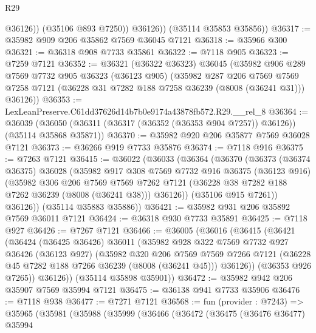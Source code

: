 \begin{lexlean}{R29}
\begin{coremodule}
                @36126))
            (@35106 @893 @7250))
          @36126))
      (@35114 @35853 @35856))
@36317 := @35982 @909 @206 @35862 @7569 @36045 @7121
@36318 := @35966 @300
@36321 := @36318 @908 @7733 @35861
@36322 := @7118 @905
@36323 := @7259 @7121
@36352 := @36321
    (@36322 @36323)
    @36045
    (@35982
      @906
      @289
      @7569
      @7732
      @905
      @36323
      (@36123 @905)
      (@35982
        @287
        @206
        @7569
        @7569
        @7258
        @7121
        (@36228 @31 @7282 @188 @7258 @36239 (@8008 (@36241 @31)))
        @36126))
@36353 := LexLeanPreserve.C61dd37626d14b7b0e9174a43878fb572.R29.__rel_8
@36364 := @36039
    (@36050 (@36311 (@36317 (@36352 (@36353 @904 @7257)) @36126)) (@35114 @35868 @35871))
@36370 := @35982 @920 @206 @35877 @7569 @36028 @7121
@36373 := @36266 @919 @7733 @35876
@36374 := @7118 @916
@36375 := @7263 @7121
@36415 := @36022
    (@36033
      (@36364
        (@36370
          (@36373
            (@36374 @36375)
            @36028
            (@35982
              @917
              @308
              @7569
              @7732
              @916
              @36375
              (@36123 @916)
              (@35982
                @306
                @206
                @7569
                @7569
                @7262
                @7121
                (@36228 @38 @7282 @188 @7262 @36239 (@8008 (@36241 @38)))
                @36126))
            (@35106 @915 @7261))
          @36126))
      (@35114 @35883 @35886))
@36421 := @35982 @931 @206 @35892 @7569 @36011 @7121
@36424 := @36318 @930 @7733 @35891
@36425 := @7118 @927
@36426 := @7267 @7121
@36466 := @36005
    (@36016
      (@36415
        (@36421
          (@36424
            (@36425 @36426)
            @36011
            (@35982
              @928
              @322
              @7569
              @7732
              @927
              @36426
              (@36123 @927)
              (@35982
                @320
                @206
                @7569
                @7569
                @7266
                @7121
                (@36228 @45 @7282 @188 @7266 @36239 (@8008 (@36241 @45)))
                @36126))
            (@36353 @926 @7265))
          @36126))
      (@35114 @35898 @35901))
@36472 := @35982 @942 @206 @35907 @7569 @35994 @7121
@36475 := @36138 @941 @7733 @35906
@36476 := @7118 @938
@36477 := @7271 @7121
@36568 := fun (provider : @7243) =>
  @35965
    (@35981
      (@35988
        (@35999
          (@36466
            (@36472
              (@36475
                (@36476 @36477)
                @35994

\end{coremodule}
\end{lexlean}
